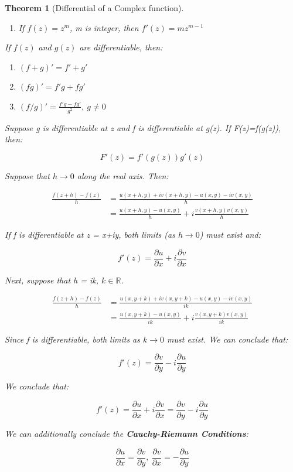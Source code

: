 \documentclass{article}
\newtheorem{theorem}{Theorem}[section]
\theoremstyle{definition}
\def\R{\mathbb{R}}
\begin{document}
\begin{theorem}[Differential of a Complex function]
\begin{enumerate}
	\item If $f(z) = z^m$, m is integer, then $f'(z) = mz^{m-1}$
\end{enumerate}
If $f(z)$ and $g(z)$ are differentiable, then:
\begin{enumerate}
	\item$(f+g)' = f'+g'$
	\item$(fg)' = f'g + fg'$
	\item$(f/g)' = \frac{f'g-fg'}{g^2},\ g \neq 0 $
\end{enumerate}


Suppose g is differentiable at z and f is differentiable at g(z). If F(z)=f(g(z)), then:

$$ F'(z) = f'(g(z))g'(z)$$

Suppose that $h \to 0$ along the real axis. Then:

\begin{align}
\frac{f(z+h) - f(z)}{h} & = \frac{u(x+h, y) + iv(x+h,y) - u(x,y) - iv(x,y)}{h}\\
& = \frac{u(x+h, y) - u(x,y) }{h} + i \frac{v(x+h,y) v(x,y)}{h}
\end{align}

If f is differentiable at z = x+iy, both limits (as $h \to 0$) must exist and:

$$f'(z) = \frac{\partial u}{\partial x} + i  \frac{\partial v}{\partial x}$$

Next, suppose that h = ik, $k \in \R$.

\begin{align}
\frac{f(z+h) - f(z)}{h} & = \frac{u(x, y+k) + iv(x,y+k) - u(x,y) - iv(x,y)}{ik}\\
& = \frac{u(x, y+k) - u(x,y) }{ik} + i \frac{v(x,y+k) v(x,y)}{ik}
\end{align}

Since f is differentiable, both limits as $k \to 0$ must exist. We can conclude that:

$$f'(z) = \frac{\partial v}{\partial y} - i  \frac{\partial u}{\partial y}$$

We conclude that:


$$\boxed{f'(z) = \frac{\partial u}{\partial x} + i  \frac{\partial v}{\partial x} = \frac{\partial v}{\partial y} - i  \frac{\partial u}{\partial y}}$$


We can additionally conclude the \textbf{Cauchy-Riemann Conditions}:

$$\frac{\partial u}{\partial x} = \frac{\partial v}{\partial y},\ \frac{\partial v}{\partial x} = -\frac{\partial u}{\partial y}$$

\end{theorem}
\end{document}
